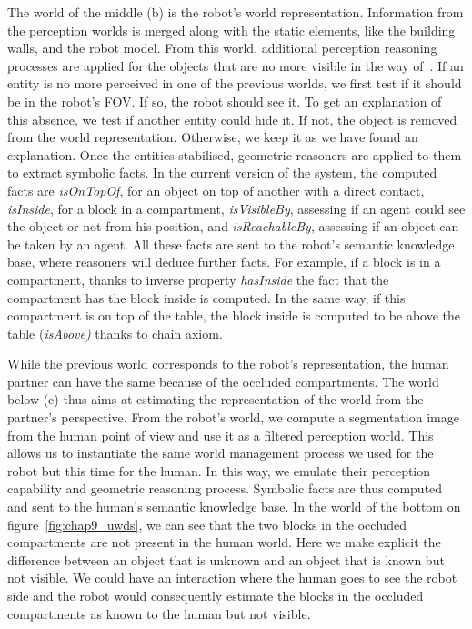 The world of the middle (b) is the robot's world representation. Information from the perception worlds is merged along with the static elements, like the building walls, and the robot model. From this world, additional perception reasoning processes are applied for the objects that are no more visible in the way of~\cite{milliez_2014_framework}. If an entity is no more perceived in one of the previous worlds, we first test if it should be in the robot's FOV. If so, the robot should see it. To get an explanation of this absence, we test if another entity could hide it. If not, the object is removed from the world representation. Otherwise, we keep it as we have found an explanation.
Once the entities stabilised, geometric reasoners are applied to them to extract symbolic facts. In the current version of the system, the computed facts are \textit{isOnTopOf}, for an object on top of another with a direct contact, \textit{isInside}, for a block in a compartment, \textit{isVisibleBy}, assessing if an agent could see the object or not from his position, and \textit{isReachableBy}, assessing if an object can be taken by an agent. All these facts are sent to the robot's semantic knowledge base, where reasoners will deduce further facts. For example, if a block is in a compartment, thanks to inverse property \textit{hasInside} the fact that the compartment has the block inside is computed. In the same way, if this compartment is on top of the table, the block inside is computed to be above the table (\textit{isAbove)} thanks to chain axiom.

While the previous world corresponds to the robot's representation, the human partner can have the same because of the occluded compartments. The world below (c) thus aims at estimating the representation of the world from the partner's perspective. From the robot's world, we compute a segmentation image from the human point of view and use it as a filtered perception world. This allows us to instantiate the same world management process we used for the robot but this time for the human. In this way, we emulate their perception capability and geometric reasoning process. Symbolic facts are thus computed and sent to the human's semantic knowledge base. In the world of the bottom on figure~\ref{fig:chap9_uwds}, we can see that the two blocks in the occluded compartments are not present in the human world. Here we make explicit the difference between an object that is unknown and an object that is known but not visible. We could have an interaction where the human goes to see the robot side and the robot would consequently estimate the blocks in the occluded compartments as known to the human but not visible.

